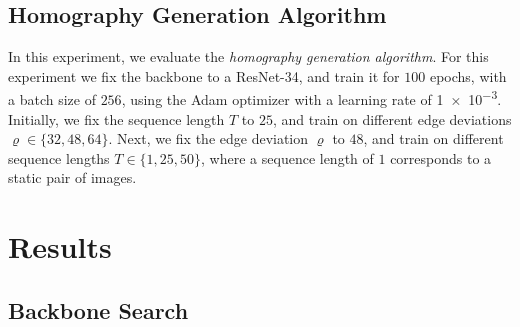 \subsection{Homography Generation Algorithm}
In this experiment, we evaluate the \textit{homography generation algorithm}. For this experiment we fix the backbone to a ResNet-34, and train it for $100$ epochs, with a batch size of $256$, using the Adam optimizer with a learning rate of \num{1e-3}. Initially, we fix the sequence length $T$ to $25$, and train on different edge deviations $\varrho\in\{32,48,64\}$. Next, we fix the edge deviation $\varrho$ to $48$, and train on different sequence lengths $T\in\{1,25,50\}$, where a sequence length of $1$ corresponds to a static pair of images.




\section{Results}






\subsection{Backbone Search}
\label{c3:sec:backbone_search}

